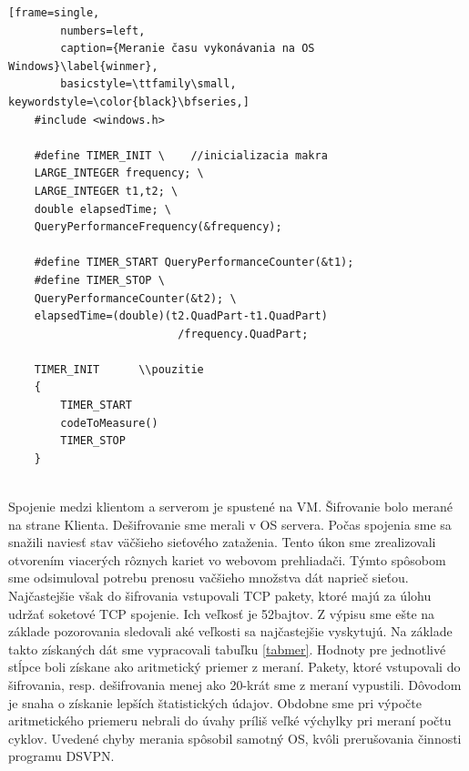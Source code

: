 \begin{minipage}{\linewidth} 	
	\begin{lstlisting}[frame=single,
		numbers=left,
		caption={Meranie času vykonávania na OS Windows}\label{winmer},
		basicstyle=\ttfamily\small, keywordstyle=\color{black}\bfseries,]
	#include <windows.h>
	
	#define TIMER_INIT \	//inicializacia makra
	LARGE_INTEGER frequency; \
	LARGE_INTEGER t1,t2; \
	double elapsedTime; \
	QueryPerformanceFrequency(&frequency);

	#define TIMER_START QueryPerformanceCounter(&t1);
	#define TIMER_STOP \
	QueryPerformanceCounter(&t2); \
	elapsedTime=(double)(t2.QuadPart-t1.QuadPart)
						  /frequency.QuadPart; 	
	
	TIMER_INIT		\\pouzitie	
	{
		TIMER_START
		codeToMeasure()
	 	TIMER_STOP
 	}
	\end{lstlisting}
\end{minipage}\\

Spojenie medzi klientom a serverom je spustené na VM. Šifrovanie bolo merané na strane Klienta. Dešifrovanie sme merali v OS servera. Počas spojenia sme sa snažili naviesť stav väčšieho sieťového zataženia. Tento úkon sme zrealizovali otvorením viacerých rôznych kariet vo webovom prehliadači. Týmto spôsobom sme odsimuloval potrebu prenosu vačšieho množstva dát naprieč sieťou. Najčastejšie však do šifrovania vstupovali TCP pakety, ktoré majú za úlohu udržať soketové TCP spojenie. Ich veľkosť je 52bajtov. Z výpisu sme ešte na základe pozorovania sledovali aké veľkosti sa najčastejšie vyskytujú. Na základe takto získaných dát sme vypracovali tabuľku \ref{tabmer}. Hodnoty pre jednotlivé stĺpce boli získane ako aritmetický priemer z meraní. Pakety, ktoré vstupovali do šifrovania, resp. dešifrovania menej ako 20-krát sme z meraní vypustili. Dôvodom je snaha o získanie lepších štatistických údajov. Obdobne sme pri výpočte aritmetického priemeru nebrali do úvahy príliš veľké výchylky pri meraní počtu cyklov. Uvedené chyby merania spôsobil samotný OS, kvôli prerušovania činnosti programu DSVPN.     

